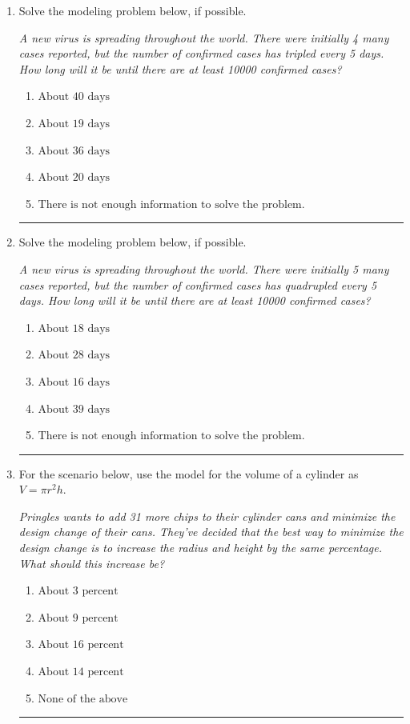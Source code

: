 \documentclass[14pt]{extbook}
\newcommand{\litem}[1]{\item#1\hspace*{-1cm}\rule{\textwidth}{0.4pt}}
\begin{document}
\begin{enumerate}
{\begin{enumerate}[label=\Alph*.]
\end{enumerate} }
\litem{
Solve the modeling problem below, if possible.
\begin{center}
    \textit{ A new virus is spreading throughout the world. There were initially 4 many cases reported, but the number of confirmed cases has tripled every 5 days. How long will it be until there are at least 10000 confirmed cases? }
\end{center}
\begin{enumerate}[label=\Alph*.]
\item \( \text{About } 40 \text{ days} \)
\item \( \text{About } 19 \text{ days} \)
\item \( \text{About } 36 \text{ days} \)
\item \( \text{About } 20 \text{ days} \)
\item \( \text{There is not enough information to solve the problem.} \)

\end{enumerate} }
\litem{
Solve the modeling problem below, if possible.
\begin{center}
    \textit{ A new virus is spreading throughout the world. There were initially 5 many cases reported, but the number of confirmed cases has quadrupled every 5 days. How long will it be until there are at least 10000 confirmed cases? }
\end{center}
\begin{enumerate}[label=\Alph*.]
\item \( \text{About } 18 \text{ days} \)
\item \( \text{About } 28 \text{ days} \)
\item \( \text{About } 16 \text{ days} \)
\item \( \text{About } 39 \text{ days} \)
\item \( \text{There is not enough information to solve the problem.} \)

\end{enumerate} }
\litem{
For the scenario below, use the model for the volume of a cylinder as $V = \pi r^2 h$.
\begin{center}
    \textit{ Pringles wants to add 31 \text{percent} more chips to their cylinder cans and minimize the design change of their cans. They've decided that the best way to minimize the design change is to increase the radius and height by the same percentage. What should this increase be? }
\end{center}
\begin{enumerate}[label=\Alph*.]
\item \( \text{About } 3 \text{ percent} \)
\item \( \text{About } 9 \text{ percent} \)
\item \( \text{About } 16 \text{ percent} \)
\item \( \text{About } 14 \text{ percent} \)
\item \( \text{None of the above} \)


\end{enumerate}}
\end{enumerate}
\end{document}
